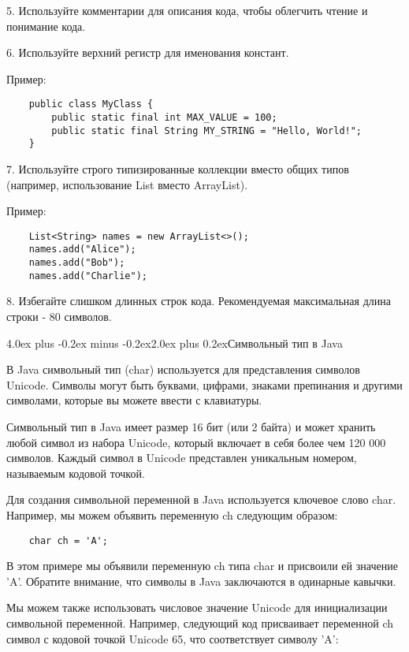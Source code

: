\documentclass[12pt, a4paper]{book}%
\makeatletter
\renewcommand{\section}{\@startsection{section}{1}{1pt}%
{4.0ex plus -0.2ex minus -0.2ex}{2.0ex plus 0.2ex}{\centering\bf}}%
\makeatother
\begin{document}
{5. Используйте комментарии для описания кода, чтобы облегчить чтение и понимание кода. 

6. Используйте верхний регистр для именования констант.

Пример:
\begin{lstlisting}
    public class MyClass {
        public static final int MAX_VALUE = 100;
        public static final String MY_STRING = "Hello, World!";
    }
\end{lstlisting}

7. Используйте строго типизированные коллекции вместо общих типов (например, использование List вместо ArrayList).

Пример:
\begin{lstlisting}
    List<String> names = new ArrayList<>();
    names.add("Alice");
    names.add("Bob");
    names.add("Charlie");
\end{lstlisting}

8. Избегайте слишком длинных строк кода. Рекомендуемая максимальная длина строки - 80 символов.

\section{Символьный тип в Java}

В Java символьный тип (char) используется для представления символов Unicode. Символы могут быть буквами, цифрами, знаками препинания и другими символами, которые вы можете ввести с клавиатуры.

Символьный тип в Java имеет размер 16 бит (или 2 байта) и может хранить любой символ из набора Unicode, который включает в себя более чем 120 000 символов. Каждый символ в Unicode представлен уникальным номером, называемым кодовой точкой.

Для создания символьной переменной в Java используется ключевое слово char. Например, мы можем объявить переменную ch следующим образом:

\begin{lstlisting}
    char ch = 'A';
\end{lstlisting}

В этом примере мы объявили переменную ch типа char и присвоили ей значение 'A'. Обратите внимание, что символы в Java заключаются в одинарные кавычки.

Мы можем также использовать числовое значение Unicode для инициализации символьной переменной. Например, следующий код присваивает переменной ch символ с кодовой точкой Unicode 65, что соответствует символу 'A':

}
\end{document}
